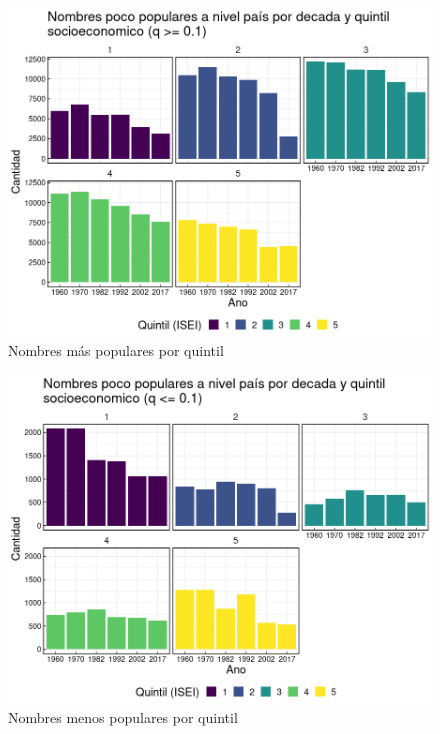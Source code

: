 \begin{landscape}
\begin{figure}[H]
\begin{center}
    \includegraphics[width=20cm]{plot/most_popular_gral.png}
    \caption{Nombres más populares por quintil}
    \label{fig:most_popular_gral}
\end{center}
\end{figure}
\end{landscape}


\begin{landscape}
\begin{figure}[H]
\begin{center}
    \includegraphics[width=20cm]{plot/poco_pop_gral.png}
    \caption{Nombres menos populares por quintil}
    \label{fig:poco_pop_gral}
\end{center}
\end{figure}
\end{landscape}


